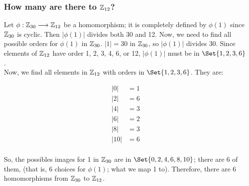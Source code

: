 \documentclass{article}
\begin{document}
\subsubsection{How many are there to $\mathbb{Z}_{12}$?}

Let $\phi : \mathbb{Z}_{30} \longrightarrow \mathbb{Z}_{12}$ be a homomorphism; it is completely defined by $\phi(1)$ since $\mathbb{Z}_{30}$ is cyclic.  Then $|\phi(1)|$ divides both 30 and 12.  Now, we need to find all possible orders for $\phi(1)$ in $\mathbb{Z}_{30}$.  $|1| = 30$ in $\mathbb{Z}_{30}$, so $|\phi(1)|$ divides 30. Since elements of $\mathbb{Z}_{12}$ have order 1, 2, 3, 4, 6, or 12, $|\phi(1)|$ must be in $\Set{1,2,3,6}$.  \\

Now, we find all elements in $\mathbb{Z}_{12}$ with orders in $\Set{1,2,3,6}$.  They are:

\begin{align*}
  |0| &= 1 \\
  |2| &= 6 \\
  |4| &= 3 \\
  |6| &= 2 \\
  |8| &= 3 \\
  |10| &= 6 \\
\end{align*}


So, the possibles images for 1 in $\mathbb{Z}_{30}$ are in $\Set{0,2,4,6,8,10}$; there are 6 of them, (that is, 6 choices for $\phi(1)$; what we map 1 to).  Therefore, there are 6 homomorphisms from $\mathbb{Z}_{30}$ to $\mathbb{Z}_{12}$.
\end{document}
